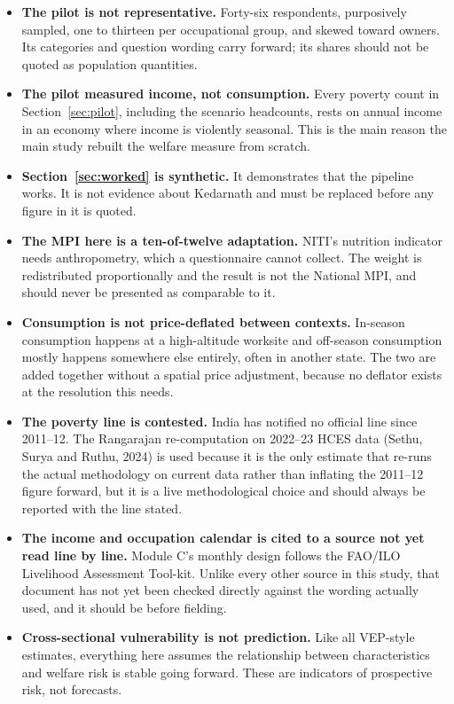 \documentclass[11pt]{article}
\begin{document}
\begin{itemize}
    \item \textbf{The pilot is not representative.} Forty-six respondents, purposively sampled, one to thirteen per occupational group, and skewed toward owners. Its categories and question wording carry forward; its shares should not be quoted as population quantities.
    \item \textbf{The pilot measured income, not consumption.} Every poverty count in Section~\ref{sec:pilot}, including the scenario headcounts, rests on annual income in an economy where income is violently seasonal. This is the main reason the main study rebuilt the welfare measure from scratch.
    \item \textbf{Section~\ref{sec:worked} is synthetic.} It demonstrates that the pipeline works. It is not evidence about Kedarnath and must be replaced before any figure in it is quoted.
    \item \textbf{The MPI here is a ten-of-twelve adaptation.} NITI's nutrition indicator needs anthropometry, which a questionnaire cannot collect. The weight is redistributed proportionally and the result is not the National MPI, and should never be presented as comparable to it.
    \item \textbf{Consumption is not price-deflated between contexts.} In-season consumption happens at a high-altitude worksite and off-season consumption mostly happens somewhere else entirely, often in another state. The two are added together without a spatial price adjustment, because no deflator exists at the resolution this needs.
    \item \textbf{The poverty line is contested.} India has notified no official line since 2011--12. The Rangarajan re-computation on 2022--23 HCES data (Sethu, Surya and Ruthu, 2024) is used because it is the only estimate that re-runs the actual methodology on current data rather than inflating the 2011--12 figure forward, but it is a live methodological choice and should always be reported with the line stated.
    \item \textbf{The income and occupation calendar is cited to a source not yet read line by line.} Module C's monthly design follows the FAO/ILO Livelihood Assessment Tool-kit. Unlike every other source in this study, that document has not yet been checked directly against the wording actually used, and it should be before fielding.
    \item \textbf{Cross-sectional vulnerability is not prediction.} Like all VEP-style estimates, everything here assumes the relationship between characteristics and welfare risk is stable going forward. These are indicators of prospective risk, not forecasts.
\end{itemize}
\end{document}
